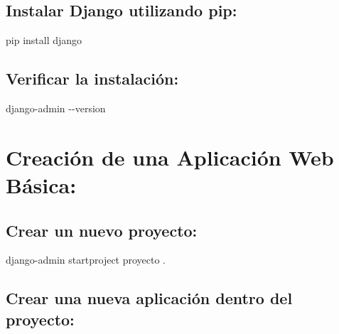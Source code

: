 \documentclass[
  a4paper,
  onepage,
  openany]{scrreprt}
\newenvironment{Shaded}{\begin{snugshade}}{\end{snugshade}}
\newcommand{\AttributeTok}[1]{\textcolor[rgb]{0.40,0.45,0.13}{#1}}
\newcommand{\ExtensionTok}[1]{\textcolor[rgb]{0.00,0.23,0.31}{#1}}
\newcommand{\NormalTok}[1]{\textcolor[rgb]{0.00,0.23,0.31}{#1}}
\begin{document}
\hypertarget{instalar-django-utilizando-pip-1}{%
\subsection{Instalar Django utilizando
pip:}\label{instalar-django-utilizando-pip-1}}

\begin{Shaded}
\begin{Highlighting}[]
\ExtensionTok{pip}\NormalTok{ install django}
\end{Highlighting}
\end{Shaded}

\hypertarget{verificar-la-instalaciuxf3n-1}{%
\subsection{Verificar la
instalación:}\label{verificar-la-instalaciuxf3n-1}}

\begin{Shaded}
\begin{Highlighting}[]
\ExtensionTok{django{-}admin} \AttributeTok{{-}{-}version}
\end{Highlighting}
\end{Shaded}

\hypertarget{creaciuxf3n-de-una-aplicaciuxf3n-web-buxe1sica-1}{%
\section{Creación de una Aplicación Web
Básica:}\label{creaciuxf3n-de-una-aplicaciuxf3n-web-buxe1sica-1}}

\hypertarget{crear-un-nuevo-proyecto-1}{%
\subsection{Crear un nuevo proyecto:}\label{crear-un-nuevo-proyecto-1}}

\begin{Shaded}
\begin{Highlighting}[]
\ExtensionTok{django{-}admin}\NormalTok{ startproject proyecto .}
\end{Highlighting}
\end{Shaded}

\hypertarget{crear-una-nueva-aplicaciuxf3n-dentro-del-proyecto-1}{%
\subsection{Crear una nueva aplicación dentro del
proyecto:}\label{crear-una-nueva-aplicaciuxf3n-dentro-del-proyecto-1}}
\end{document}
